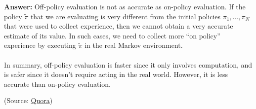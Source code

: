 \documentclass{article}
\newenvironment{QandA}{\begin{enumerate}[label=\arabic*.]}{\end{enumerate}}
\newenvironment{answer}{\par\normalfont \textbf{Answer:}}{}
\begin{document}
\begin{QandA}
\begin{answer}
        Off-policy evaluation is not as accurate as on-policy evaluation. If the policy $\tilde{\pi}$ that we are evaluating is very different from the initial policies $\pi_1, \ldots, \pi_N$ that were used to collect experience, then we cannot obtain a very accurate estimate of its value. In such cases, we need to collect more “on policy” experience by executing $\tilde{\pi}$ in the real Markov environment.\\\\
        In summary, off-policy evaluation is faster since it only involves computation, and is safer since it doesn't require acting in the real world. However, it is less accurate than on-policy evaluation.

        (Source: \href{https://www.quora.com/What-are-the-benefits-of-using-off-policy-learning-over-on-policy-learning-in-reinforcement-learning}{Quora})
    \end{answer}


\end{QandA}
\end{document}

